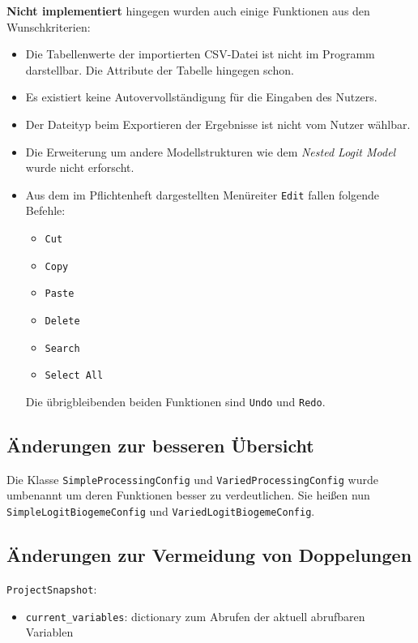 \documentclass{article}
\newcommand{\classref}[1]{\texttt{#1}}
\begin{document}
\textbf{Nicht implementiert} hingegen wurden auch einige Funktionen aus den Wunschkriterien:
\begin{itemize}
    \item Die Tabellenwerte der importierten CSV-Datei ist nicht im Programm darstellbar. Die Attribute der Tabelle hingegen schon.
    \item Es existiert keine Autovervollständigung für die Eingaben des Nutzers.
    \item Der Dateityp beim Exportieren der Ergebnisse ist nicht vom Nutzer wählbar.
    \item Die Erweiterung um andere Modellstrukturen wie dem \textit{Nested Logit Model} wurde nicht erforscht.
    \item Aus dem im Pflichtenheft dargestellten Menüreiter \texttt{Edit} fallen folgende Befehle:
    \begin{itemize}
        \item \texttt{Cut}
        \item \texttt{Copy}
        \item \texttt{Paste}
        \item \texttt{Delete}
        \item \texttt{Search}
        \item \texttt{Select All}
    \end{itemize}
    Die übrigbleibenden beiden Funktionen sind \texttt{Undo} und \texttt{Redo}. 
\end{itemize}


\subsection{Änderungen zur besseren Übersicht}

Die Klasse \classref{SimpleProcessingConfig} und \classref{VariedProcessingConfig} wurde umbenannt um deren Funktionen besser zu verdeutlichen. Sie heißen nun \classref{SimpleLogitBiogemeConfig} und \classref{VariedLogitBiogemeConfig}.

\subsection{Änderungen zur Vermeidung von Doppelungen}

\classref{ProjectSnapshot}:
\begin{itemize}
    \item \texttt{current\_variables}: dictionary zum Abrufen der aktuell abrufbaren Variablen
\end{itemize}
\end{document}
